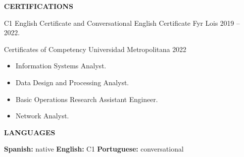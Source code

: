\documentclass[10pt,a4paper]{article}
\newcommand{\cvsection}[1]{%
    \vspace{11pt}%
    {\large\bfseries\color{navy}#1}\par
    \vspace{2pt}{\color{accent}\rule{\linewidth}{1.2pt}}\par
    \vspace{5pt}%
}
\begin{document}
\cvsection{CERTIFICATIONS}
C1 English Certificate and Conversational English Certificate \textbar{} Fyr Lois \textbar{} 2019 -- 2022.

\vspace{4pt}
Certificates of Competency \textbar{} Universidad Metropolitana \textbar{} 2022
\begin{itemize}
    \item Information Systems Analyst.
    \item Data Design and Processing Analyst.
    \item Basic Operations Research Assistant Engineer.
    \item Network Analyst.
\end{itemize}

\cvsection{LANGUAGES}
\textbf{Spanish:} native \hfill
\textbf{English:} C1 \hfill
\textbf{Portuguese:} conversational
\end{document}
